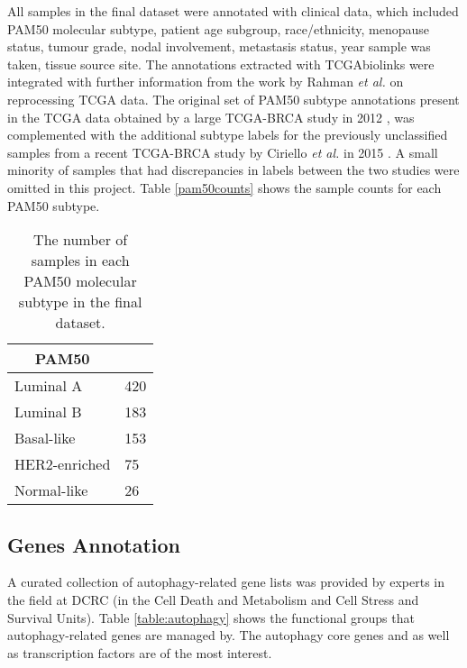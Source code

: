  

    All samples in the final dataset were annotated with clinical data, which included PAM50 molecular subtype, patient age subgroup, race/ethnicity, menopause status, tumour grade, nodal involvement, metastasis status, year sample was taken, tissue source site. The annotations extracted with TCGAbiolinks were integrated with further information from the work by Rahman \textit{et al. }\cite{RahmanAlternativeResults} on reprocessing TCGA data. 
    The original set of PAM50 subtype annotations present in the TCGA data obtained by a large TCGA-BRCA study in 2012 \cite{CancerGenomeAtlasNetwork2012ComprehensiveTumours}, was complemented with the additional subtype labels for the previously unclassified samples from a recent TCGA-BRCA study by Ciriello \textit{et al.} in 2015 \cite{Ciriello2015ComprehensiveCancer}. A small minority of samples that had discrepancies in labels between the two studies were omitted in this project.  Table \ref{pam50counts} shows the sample counts for each PAM50 subtype. 
    
    
                \begin{table}[!htbp]
                \centering
                \caption{The number of samples in each PAM50 molecular subtype in the final dataset.}
                \label{table:pam50counts}
                \begin{tabular}{ll}
                \multicolumn{1}{c}{\textbf{PAM50}} &  \\ \hline
                \multicolumn{1}{|l|}{Luminal A} & \multicolumn{1}{l|}{420} \\ \hline
                \multicolumn{1}{|l|}{Luminal B} & \multicolumn{1}{l|}{183} \\ \hline
                \multicolumn{1}{|l|}{Basal-like} & \multicolumn{1}{l|}{153} \\ \hline
                \multicolumn{1}{|l|}{HER2-enriched} & \multicolumn{1}{l|}{75} \\ \hline
                \multicolumn{1}{|l|}{Normal-like} & \multicolumn{1}{l|}{26} \\ \hline
                \end{tabular}
                \end{table}
                

    
    
     \subsection{Genes Annotation}   
    A curated collection of autophagy-related gene lists was provided by experts in the field at DCRC (in the Cell Death and Metabolism and Cell Stress and Survival Units). Table \ref{table:autophagy} shows the functional groups that autophagy-related genes are managed by. The autophagy core genes and as well as transcription factors are of the most interest. 
    
